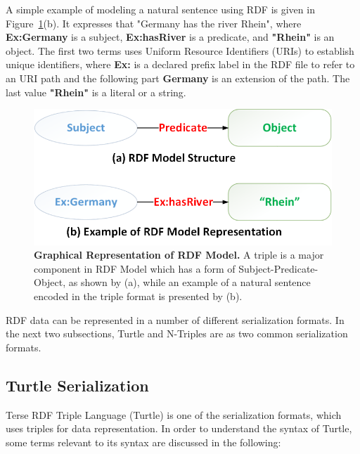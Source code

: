 A simple example of modeling a natural sentence using RDF is given in Figure~\ref{Fig:rdfModel}(b). 
It expresses that "Germany has the river Rhein", where \textbf{Ex:Germany} is a subject, \textbf{Ex:hasRiver} is a predicate, and \textbf{"Rhein"} is an object. 
The first two terms uses Uniform Resource Identifiers (URIs) to establish unique identifiers, where \textbf{Ex:} is a declared prefix label in the RDF file to refer to an URI path and the following part \textbf{Germany} is an extension of the path. 
The last value \textbf{"Rhein"} is a literal or a string. %

\begin{figure}[ht]
	\begin{center}
		\includegraphics[scale=0.4,angle=0]{images/RDF-Model}
		\setlength\belowcaptionskip{-5mm}
		\caption{\textbf{Graphical Representation of RDF Model.} A triple is a major component in RDF Model which has a form of Subject-Predicate-Object, as shown by (a), while an example of a natural sentence encoded in the triple format is presented by (b).}
		\label{Fig:rdfModel}
	\end{center}
\end{figure}
RDF data can be represented in a number of different serialization formats.
In the next two subsections, Turtle and N-Triples are as two common serialization formats. 

\subsection{Turtle Serialization}
Terse RDF Triple Language (Turtle) \cite{W3C:Turtle:Online} is one of the serialization formats, which uses triples for data representation. 
In order to understand the syntax of Turtle, some terms  relevant to its syntax are discussed in the following:

